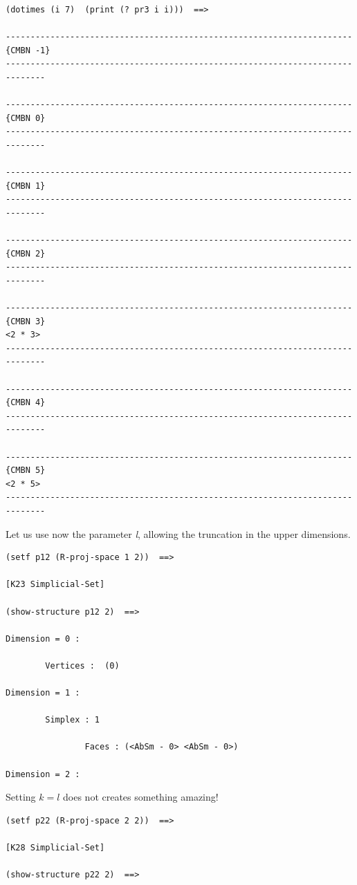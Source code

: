 {{\begin{verbatim}
(dotimes (i 7)  (print (? pr3 i i)))  ==>

----------------------------------------------------------------------{CMBN -1}
------------------------------------------------------------------------------

----------------------------------------------------------------------{CMBN 0}
------------------------------------------------------------------------------

----------------------------------------------------------------------{CMBN 1}
------------------------------------------------------------------------------

----------------------------------------------------------------------{CMBN 2}
------------------------------------------------------------------------------

----------------------------------------------------------------------{CMBN 3}
<2 * 3>
------------------------------------------------------------------------------

----------------------------------------------------------------------{CMBN 4}
------------------------------------------------------------------------------

----------------------------------------------------------------------{CMBN 5}
<2 * 5>
------------------------------------------------------------------------------
\end{verbatim}}
Let us use now the parameter {\em l}, allowing the truncation in the upper dimensions.
{\footnotesize\begin{verbatim}
(setf p12 (R-proj-space 1 2))  ==>

[K23 Simplicial-Set]

(show-structure p12 2)  ==>

Dimension = 0 :

        Vertices :  (0)

Dimension = 1 :

        Simplex : 1

                Faces : (<AbSm - 0> <AbSm - 0>)

Dimension = 2 :
\end{verbatim}}
Setting $k=l$ does not creates something amazing!
{\footnotesize\begin{verbatim}
(setf p22 (R-proj-space 2 2))  ==>

[K28 Simplicial-Set]

(show-structure p22 2)  ==>


\end{verbatim}}}
